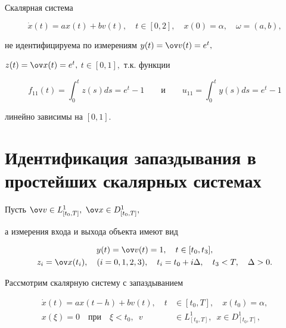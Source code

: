 \begin{exam}


Скалярная система


$$


\Dot{x}(t) = a x(t) + b v(t) ,\quad


t\in[0,2],\quad x(0)=\alpha,\quad \omega= (a,b),


$$


не идентифицируема по измерениям $y(t) = \ov v(t) = e^t,$


$z(t)= \ov x(t) = e^t,$ $t\in[0,1],$ т.к. функции


$$


f_{11}(t)=\int_0^tz(s)ds = e^t-1\qquad


\text{и}\qquad


u_{11}=\int_0^t y(s)ds = e^t-1


$$


линейно зависимы на $[0,1].$


\end{exam}





\section{Идентификация запаздывания в простейших скалярных системах}





Пусть $\ov v\in L^1_{[t_0,T]},$ $\ov x\in D^1_{[t_0,T]},$


а измерения входа и выхода объекта имеют вид


\begin{gather}


y(t) = \ov v(t) = 1,\quad t\in[t_0,t_3],\\


z_i = \ov x(t_i),\quad (i=0, 1, 2, 3),\quad t_i= t_0 + i\Delta,\quad 


t_3<T,\quad \Delta>0.


\end{gather}


Рассмотрим скалярную систему с запаздыванием


\begin{equation}


\begin{split}


\Dot{x}(t) = a x(t-h) + b v(t),\quad t&\in[t_0,T],\quad x(t_0)=\alpha,\\


x(\xi)=0\quad \text{при}\quad \xi<t_0, \ \;


v&\in L^1_{[t_0,T]},\ \; x\in D^1_{[t_0,T]},


\end{split}


\end{equation}


